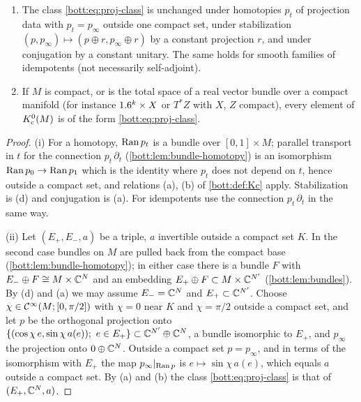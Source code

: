 \begin{lemma}\label{bott:lem:proj-model}
  \begin{enumerate}[label=(\roman*)]
  \item The class \eqref{bott:eq:proj-class} is unchanged under homotopies $p_t$ of
    projection data with $p_t=p_\infty$ outside one compact set, under stabilization
    $(p,p_\infty)\mapsto(p\oplus r,p_\infty\oplus r)$ by a constant projection $r$, and under
    conjugation by a constant unitary. The same holds for smooth families of idempotents
    (not necessarily self-adjoint).
  \item If $M$ is compact, or is the total space of a real vector bundle over a compact
    manifold (for instance $1.6^k\times X$ or $T^*Z$ with $X$, $Z$ compact), every element of
    $K_{\mathrm{c}}^0(M)$ is of the form \eqref{bott:eq:proj-class}.
  \end{enumerate}
\end{lemma}
\begin{proof}
  (i) For a homotopy, $\operatorname{Ran} p_t$ is a bundle over $[0,1]\times M$; parallel transport in
  $t$ for the connection $p_t\,\partial_t$ (\cref{bott:lem:bundle-homotopy}) is an
  isomorphism $\operatorname{Ran} p_0\to\operatorname{Ran} p_1$ which is the identity where $p_t$ does not depend on
  $t$, hence outside a compact set, and relations (a), (b) of \cref{bott:def:Kc} apply.
  Stabilization is (d) and conjugation is (a). For idempotents use the connection
  $p_t\,\partial_t$ in the same way.

  (ii) Let $(E_+,E_-,a)$ be a triple, $a$ invertible outside a compact set $K$. In the
  second case bundles on $M$ are pulled back from the compact base
  (\cref{bott:lem:bundle-homotopy}); in either case there is a bundle $F$ with
  $E_-\oplus F\cong M\times\mathbb{C}^N$ and an embedding $E_+\oplus F\subset M\times\mathbb{C}^{N'}$
  (\cref{bott:lem:bundles}). By (d) and (a) we may assume $E_-=\mathbb{C}^N$ and
  $E_+\subset\mathbb{C}^{N'}$. Choose $\chi\in\mathcal{C}^\infty(M;[0,\pi/2])$ with $\chi=0$ near $K$ and
  $\chi=\pi/2$ outside a compact set, and let $p$ be the orthogonal projection onto
  $\{(\cos\chi\,e,\sin\chi\,a(e));\ e\in E_+\}\subset\mathbb{C}^{N'}\oplus\mathbb{C}^N$, a bundle isomorphic
  to $E_+$, and $p_\infty$ the projection onto $0\oplus\mathbb{C}^N$. Outside a compact set
  $p=p_\infty$, and in terms of the isomorphism with $E_+$ the map $p_\infty|_{\operatorname{Ran} p}$ is
  $e\mapsto\sin\chi\,a(e)$, which equals $a$ outside a compact set. By (a) and (b) the
  class \eqref{bott:eq:proj-class} is that of $(E_+,\mathbb{C}^N,a)$.
\end{proof}

